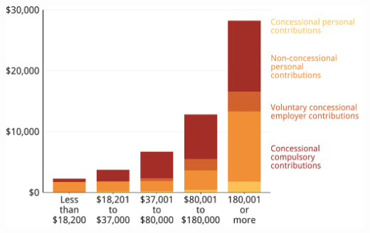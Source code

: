\documentclass[tikz]{standalone}\usepackage[]{graphicx}\usepackage[]{color}
\newenvironment{knitrout}{}{} %
\begin{document}
\begin{knitrout}
\color{fgcolor}
\includegraphics[width=12.1in,height=7.5in]{./Super-tax-targeting/b5-super-atlas/Figure4-3-1} 

\end{knitrout}
\end{document}
